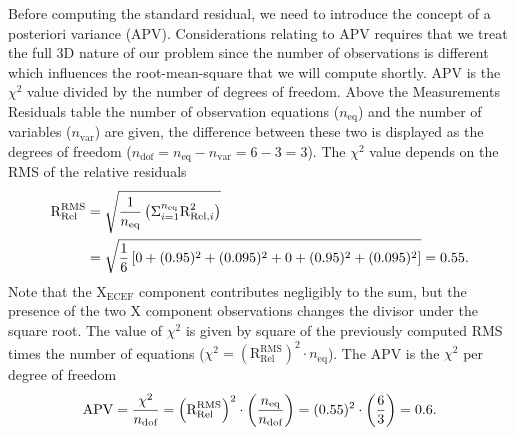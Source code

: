 Before computing the standard residual, we need to introduce the concept of a posteriori variance (APV).  Considerations relating to APV requires that we treat the full 3D nature of our problem since the number of observations is different which influences the root-mean-square that we will compute shortly.  APV is the $\chi^2$ value divided by the number of degrees of freedom.  Above the Measurements Residuals table the number of observation equations ($n_{\text{eq}}$) and the number of variables ($n_{\text{var}}$) are given, the difference between these two is displayed as the degrees of freedom ($n_{\text{dof}}=n_{\text{eq}}-n_{\text{var}}=6-3=3$).  The $\chi^2$ value depends on the RMS of the relative residuals
\begin{equation}
\begin{split}
\text{R}_{\text{Rel}}^{\text{RMS}}&=\sqrt{\frac{1}{n_{\text{eq}}}\left(\Sigma_{i=1}^{n_{\text{eq}}}\text{R}_{\text{Rel},i}^2\right)}\\
&=\sqrt{\frac{1}{6}\left[0+(0.95)^2+(0.095)^2+0+(0.95)^2+(0.095)^2\right]}=0.55.
\end{split}
\end{equation}
Note that the $\text{X}_{\text{ECEF}}$ component contributes negligibly to the sum, but the presence of the two $\text{X}$ component observations changes the divisor under the square root.  The value of $\chi^2$ is given by square of the previously computed RMS times the number of equations ($\chi^2=(\text{R}_{\text{Rel}}^{\text{RMS}})^2\cdot n_{\text{eq}}$).  The APV is the $\chi^2$ per degree of freedom
\begin{equation}
\text{APV}=\frac{\chi^2}{n_{\text{dof}}}=\left(\text{R}_{\text{Rel}}^{\text{RMS}}\right)^2\cdot\left(\frac{n_{\text{eq}}}{n_{\text{dof}}}\right)=(0.55)^2\cdot\left(\frac{6}{3}\right)=0.6.
\end{equation}
{}\\

